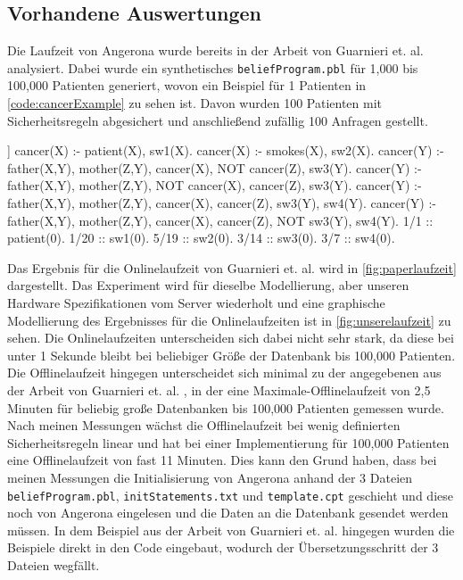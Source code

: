 \documentclass[german,version-2020-11]{uzl-thesis}
\begin{document}
\subsection{Vorhandene Auswertungen}
Die Laufzeit von Angerona wurde bereits in der Arbeit von Guarnieri et. al. \cite{guarnieri2017securing} analysiert. Dabei wurde ein synthetisches \texttt{beliefProgram.pbl} für 1,000 bis 100,000 Patienten generiert, wovon ein Beispiel für 1 Patienten in \autoref{code:cancerExample} zu sehen ist. Davon wurden 100 Patienten mit Sicherheitsregeln abgesichert und anschließend zufällig 100 Anfragen gestellt. \\ 
\begin{Pseudocode}[caption={\texttt{beliefProgram.pbl} für das Beispiel aus \cite{6}}, label={code:cancerExample}]]
cancer(X) :- patient(X), sw1(X).
cancer(X) :- smokes(X), sw2(X).
cancer(Y) :- father(X,Y), mother(Z,Y), cancer(X), NOT cancer(Z), sw3(Y).
cancer(Y) :- father(X,Y), mother(Z,Y), NOT cancer(X), cancer(Z), sw3(Y).
cancer(Y) :- father(X,Y), mother(Z,Y), cancer(X), cancer(Z), sw3(Y), sw4(Y).
cancer(Y) :- father(X,Y), mother(Z,Y), cancer(X), cancer(Z), NOT sw3(Y), sw4(Y).
1/1 :: patient(0).
1/20 :: sw1(0).
5/19 :: sw2(0).
3/14 :: sw3(0).
3/7 :: sw4(0).
\end{Pseudocode}
Das Ergebnis für die Onlinelaufzeit von Guarnieri et. al. \cite{guarnieri2017securing} wird in \autoref{fig:paperlaufzeit} dargestellt. Das Experiment wird für dieselbe Modellierung, aber unseren Hardware Spezifikationen vom Server wiederholt und eine graphische Modellierung des Ergebnisses für die Onlinelaufzeiten ist in \autoref{fig:unserelaufzeit} zu sehen. Die Onlinelaufzeiten unterscheiden sich dabei nicht sehr stark, da diese bei unter 1 Sekunde bleibt bei beliebiger Größe der Datenbank bis 100,000 Patienten. \\
Die Offlinelaufzeit hingegen unterscheidet sich minimal zu der angegebenen aus der Arbeit von Guarnieri et. al. \cite{guarnieri2017securing}, in der eine Maximale-Offlinelaufzeit von 2,5 Minuten für beliebig große Datenbanken bis 100,000 Patienten gemessen wurde. Nach meinen Messungen wächst die Offlinelaufzeit bei wenig definierten Sicherheitsregeln linear und hat bei einer Implementierung für 100,000 Patienten eine Offlinelaufzeit von fast 11 Minuten. Dies kann den Grund haben, dass bei meinen Messungen die Initialisierung von Angerona anhand der 3 Dateien \texttt{beliefProgram.pbl}, \texttt{initStatements.txt} und \texttt{template.cpt} geschieht und diese noch von Angerona eingelesen und die Daten an die Datenbank gesendet werden müssen. In dem Beispiel aus der Arbeit von Guarnieri et. al. \cite{guarnieri2017securing} hingegen wurden die Beispiele direkt in den Code eingebaut, wodurch der Übersetzungsschritt der 3 Dateien wegfällt.\\  
\end{document}
